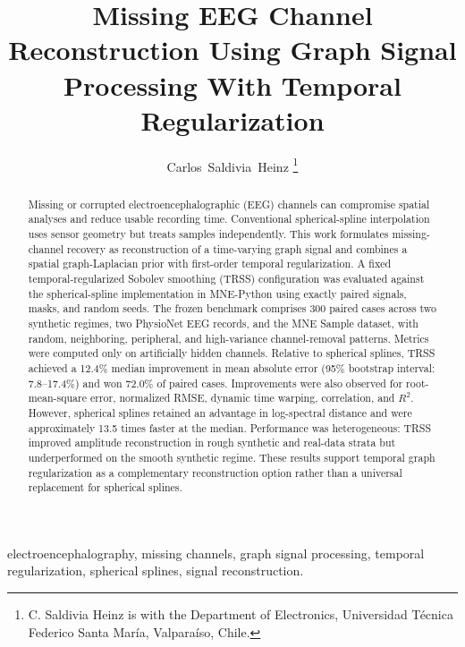 \documentclass[journal]{IEEEtran}
\title{Missing EEG Channel Reconstruction Using Graph Signal Processing With Temporal Regularization}
\author{Carlos~Saldivia~Heinz%
\thanks{C. Saldivia Heinz is with the Department of Electronics, Universidad T\'ecnica Federico Santa Mar\'ia, Valpara\'iso, Chile.}}
\begin{document}
\maketitle

\begin{abstract}
Missing or corrupted electroencephalographic (EEG) channels can compromise spatial analyses and reduce usable recording time. Conventional spherical-spline interpolation uses sensor geometry but treats samples independently. This work formulates missing-channel recovery as reconstruction of a time-varying graph signal and combines a spatial graph-Laplacian prior with first-order temporal regularization. A fixed temporal-regularized Sobolev smoothing (TRSS) configuration was evaluated against the spherical-spline implementation in MNE-Python using exactly paired signals, masks, and random seeds. The frozen benchmark comprises 300 paired cases across two synthetic regimes, two PhysioNet EEG records, and the MNE Sample dataset, with random, neighboring, peripheral, and high-variance channel-removal patterns. Metrics were computed only on artificially hidden channels. Relative to spherical splines, TRSS achieved a 12.4\% median improvement in mean absolute error (95\% bootstrap interval: 7.8--17.4\%) and won 72.0\% of paired cases. Improvements were also observed for root-mean-square error, normalized RMSE, dynamic time warping, correlation, and $R^2$. However, spherical splines retained an advantage in log-spectral distance and were approximately 13.5 times faster at the median. Performance was heterogeneous: TRSS improved amplitude reconstruction in rough synthetic and real-data strata but underperformed on the smooth synthetic regime. These results support temporal graph regularization as a complementary reconstruction option rather than a universal replacement for spherical splines.
\end{abstract}

\begin{IEEEkeywords}
electroencephalography, missing channels, graph signal processing, temporal regularization, spherical splines, signal reconstruction.
\end{IEEEkeywords}










\end{document}
